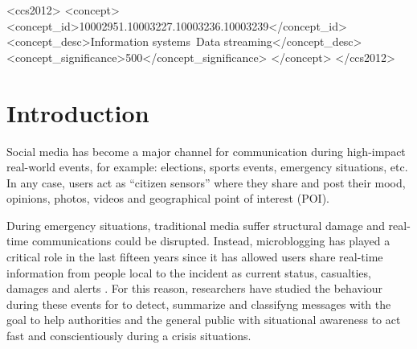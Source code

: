 \documentclass[sigconf]{acmart}
\begin{document}
%
%
\begin{CCSXML}
	<ccs2012>
	<concept>
	<concept_id>10002951.10003227.10003236.10003239</concept_id>
	<concept_desc>Information systems~Data streaming</concept_desc>
	<concept_significance>500</concept_significance>
	</concept>
	</ccs2012>
\end{CCSXML}




\maketitle

\section{Introduction}
Social media has become a major channel for communication during high-impact real-world events, for example: elections, sports events, emergency situations, etc. In any case, users act as ``citizen sensors'' where they share and post their mood, opinions, photos, videos and geographical point of interest (POI).

During emergency situations, traditional media suffer structural damage and real-time communications could be disrupted. Instead, microblogging has played a critical role in the last fifteen years since it has allowed users share real-time information from people local to the incident as current status, casualties, damages and alerts \cite{kumar2011tweettracker,imran2013extracting,stowe2016identifying,reuterfifteen}. For this reason, researchers have studied the behaviour during these events for to detect, summarize and classifyng messages with the goal to help authorities and the general public with situational awareness to act fast and conscientiously during a crisis situations.
\end{document}
